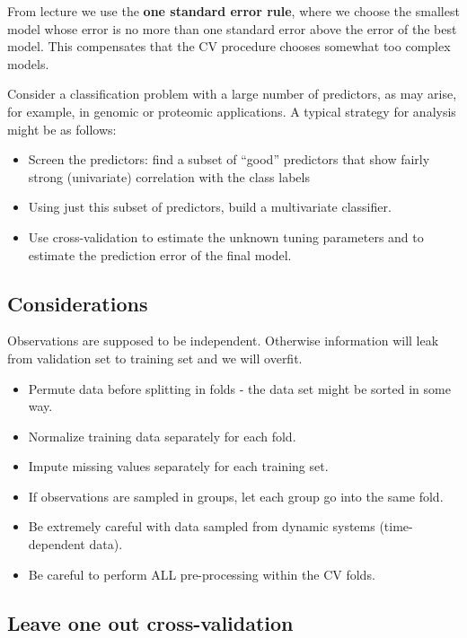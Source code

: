 From lecture \cite[p.~32]{lecture2} we use the \textbf{one standard error rule}, where we choose the smallest model whose error is no more than one standard error above the error of the best model.
This compensates that the CV procedure chooses somewhat too complex models.

Consider a classification problem with a large number of predictors, as may arise, for example, in genomic or proteomic applications. A typical strategy for analysis might be as follows:

\begin{itemize}
  \item Screen the predictors: find a subset of “good” predictors that show fairly strong (univariate) correlation with the class labels
  \item Using just this subset of predictors, build a multivariate classifier.
  \item Use cross-validation to estimate the unknown tuning parameters and to estimate the prediction error of the final model.
\end{itemize}

\subsection{Considerations}

Observations are supposed to be independent. Otherwise
information will leak from validation set to training set and we
will overfit.

\begin{itemize}
  \item Permute data before splitting in folds - the data set might be sorted in some way.
  \item Normalize training data separately for each fold.
  \item Impute missing values separately for each training set.
  \item If observations are sampled in groups, let each group go into the same fold.
  \item Be extremely careful with data sampled from dynamic systems (time-dependent data).
  \item Be careful to perform ALL pre-processing within the CV folds.
\end{itemize} \cite[p.~34]{lecture2}\cite[p.~241-249]{friedman2016elements}

\subsection{Leave one out cross-validation}

